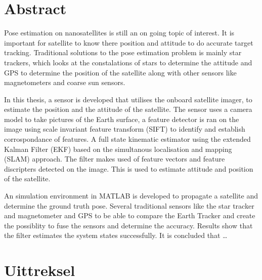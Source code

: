 \chapter*{Abstract}
\makeatletter{}\makeatother

\noindent Pose estimation on nanosatellites is still an on going topic of interest.
It is important for satellite to know there position and attitude to do accurate target tracking.
Traditional solutions to the pose estimation problem is mainly star trackers, which looks at the constalations of stars to determine the attitude
and GPS to determine the position of the satellite along with other sensors like magnetometers and coarse sun sensors.

\vspace{0.5cm}

\noindent In this thesis, a sensor is developed that utilises the onboard satellite imager, to estimate the position and the attitude of the satellite.
The sensor uses a camera model to take pictures of the Earth surface, a feature detector is ran on the image using scale invariant feature transform (SIFT)
to identify and establish corrospondance of features. A full state kinematic estimator using the extended Kalman Filter (EKF) based on the simultanous
localisation and mapping (SLAM) approach. The filter makes used of feature vectors and feature discripters detected on the image. This is used to estimate
attitude and position of the satellite.

\vspace{0.5cm}

\noindent An simulation environment in MATLAB is developed to propagate a satellite and determine the ground truth pose. Several traditional sensors
like the star tracker and magnetometer and GPS to be able to compare the Earth Tracker and create the possiblity to fuse the sensors and determine the accuracy.
Results show that the filter estimates the system states successfully. It is concluded that \dots


\newpage
{}

\chapter*{Uittreksel}
\makeatletter{}\makeatother

